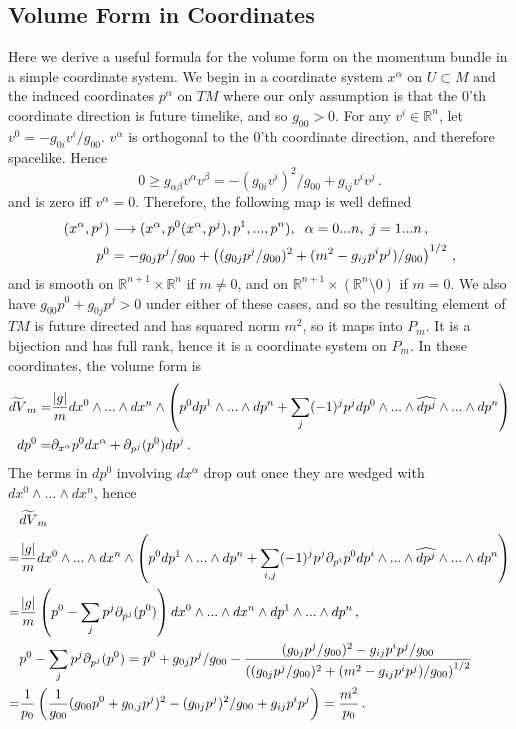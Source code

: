 \subsection{Volume Form in Coordinates}\label{coord_comp}
Here we derive a useful formula for the volume form on the momentum bundle in a simple coordinate system.  We begin in a coordinate system $x^\alpha$ on $U\subset M$ and the induced coordinates $p^\alpha$ on $TM$ where our only assumption is that the $0$'th coordinate direction is future timelike, and so $g_{00}>0$.  For any $v^i\in \mathbb{R}^n$, let $v^0=-g_{0i}v^i/g_{00}$.  $v^\alpha$ is orthogonal to the $0$'th coordinate direction, and therefore spacelike. Hence 
\begin{equation}
0\geq g_{\alpha \beta}v^\alpha v^\beta=-(g_{0i}v^i)^2/g_{00}+g_{ij}v^iv^j\,.
\end{equation}
and is zero iff $v^\alpha=0$. Therefore, the following map is well defined
\begin{align}
(x^\alpha,p^j)&\longrightarrow (x^\alpha,p^0(x^\alpha,p^j),p^1,...,p^n),  \hspace{2mm} \alpha=0...n, \hspace{1mm} j=1...n \,,\notag\\
 p^0&=-g_{0j}p^j/g_{00}+\left((g_{0j}p^j/g_{00})^2+(m^2-g_{ij}p^ip^j)/g_{00}\right)^{1/2}\,,
\end{align}
and is smooth on $\mathbb{R}^{n+1}\times\mathbb{R}^n$ if $m\neq 0$, and on $\mathbb{R}^{n+1}\times\left(\mathbb{R}^n\setminus{0}\right)$ if $m=0$.  We also have $g_{00}p^0+g_{0j}p^j>0$ under either of these cases, and so the resulting element of $TM$ is future directed and has squared norm $m^2$, so it maps into $P_m$.  It is a bijection and has full rank, hence it is a coordinate system on $P_m$.  In these coordinates, the volume form is
\begin{align}
\widetilde{dV}_m=&\frac{|g|}{m}dx^0\wedge...\wedge dx^n\wedge\left(p^0dp^1\wedge...\wedge dp^n+\sum_j (-1)^j p^j dp^0\wedge...\wedge\widehat{dp^j}\wedge...\wedge dp^n\right)\notag\\
dp^0=&\partial_{x^\alpha} p^0dx^\alpha+\partial_{p^j}(p^0) dp^j\,.
\end{align}
The terms in $dp^0$ involving $dx^\alpha$ drop out once they are wedged with $dx^0\wedge...\wedge dx^n$, hence
\begin{align}
&\widetilde{dV}_m\\
=&\frac{|g|}{m}dx^0\wedge...\wedge dx^n\wedge\left(p^0dp^1\wedge...\wedge dp^n+\sum_{i,j} (-1)^j p^j \partial_{p^i}p^0 dp^i\wedge...\wedge\widehat{dp^j}\wedge...\wedge dp^n\right)\notag\\
=&\frac{|g|}{m}\left(p^0-\sum_{j}p^j \partial_{p^j}(p^0) \right)dx^0\wedge...\wedge dx^n\wedge dp^1\wedge...\wedge dp^n\,,\notag\\
&p^0-\sum_jp^j\partial_{p^j}(p^0)= p^0+g_{0j}p^j/g_{00}-\frac{(g_{0j}p^j/g_{00})^2-g_{ij}p^ip^j/g_{00}}{\left((g_{0j}p^j/g_{00})^2+(m^2-g_{ij}p^ip^j)/g_{00}\right)^{1/2}}\notag\\
=&\frac{1}{p_0}\left(\frac{1}{g_{00}}(g_{00}p^0+g_{0,j}p^j)^2-(g_{0j}p^j)^2/g_{00}+g_{ij}p^ip^j\right)=\frac{m^2}{p_0}\,.\notag
\end{align}
